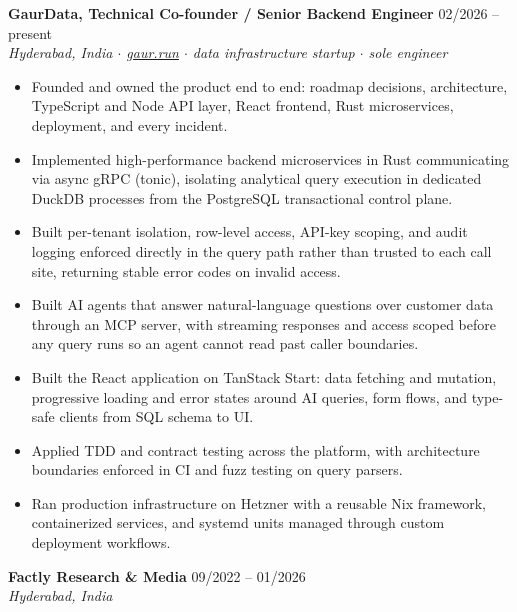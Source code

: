 \documentclass[10pt,a4paper]{article}
\newcommand{\entryheader}[4]{
  \noindent\textbf{\color{primary}#1} \hfill {\small\color{meta}#2}\\
  \textit{\small #3} \hfill {\small\color{meta}#4}\vspace{2pt}
}
\begin{document}
\entryheader{GaurData, Technical Co-founder / Senior Backend Engineer}{02/2026 -- present}{Hyderabad, India $\cdot$ \href{https://gaur.run}{gaur.run} $\cdot$ data infrastructure startup $\cdot$ sole engineer}{}
\begin{itemize}
  \item Founded and owned the product end to end: roadmap decisions, architecture, TypeScript and Node API layer, React frontend, Rust microservices, deployment, and every incident.
  \item Implemented high-performance backend microservices in Rust communicating via async gRPC (tonic), isolating analytical query execution in dedicated DuckDB processes from the PostgreSQL transactional control plane.
  \item Built per-tenant isolation, row-level access, API-key scoping, and audit logging enforced directly in the query path rather than trusted to each call site, returning stable error codes on invalid access.
  \item Built AI agents that answer natural-language questions over customer data through an MCP server, with streaming responses and access scoped before any query runs so an agent cannot read past caller boundaries.
  \item Built the React application on TanStack Start: data fetching and mutation, progressive loading and error states around AI queries, form flows, and type-safe clients from SQL schema to UI.
  \item Applied TDD and contract testing across the platform, with architecture boundaries enforced in CI and fuzz testing on query parsers.
  \item Ran production infrastructure on Hetzner with a reusable Nix framework, containerized services, and systemd units managed through custom deployment workflows.
\end{itemize}

\entryheader{Factly Research \& Media}{09/2022 -- 01/2026}{Hyderabad, India}{}
\end{document}

